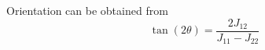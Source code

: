 	
		Orientation can be obtained from	
		\begin{equation}
			\tan(2\theta) = \dfrac{2 J_{12}}{J_{11} - J_{22}}
		\end{equation}
	
